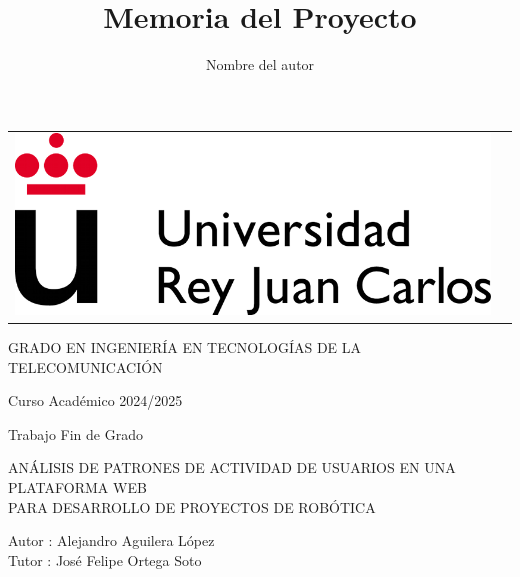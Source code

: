 \documentclass[a4paper, 12pt]{book}
\title{Memoria del Proyecto}
\author{Nombre del autor}
\begin{document}
 


\begin{titlepage}
\begin{center}
\begin{tabular}[c]{c c}
\includegraphics[scale=1.5]{img/LogoURJC.png}
\\
\end{tabular}

\vspace{3cm}

\Large 
GRADO EN INGENIERÍA EN TECNOLOGÍAS DE LA TELECOMUNICACIÓN

\vspace{0.4cm}

\large
Curso Académico 2024/2025

\vspace{0.8cm}

Trabajo Fin de Grado

\vspace{2cm}

\LARGE ANÁLISIS DE PATRONES DE ACTIVIDAD DE USUARIOS EN UNA PLATAFORMA WEB \\
PARA DESARROLLO DE PROYECTOS DE ROBÓTICA
\vspace{3cm}

\large
Autor : Alejandro Aguilera López \\
Tutor : José Felipe Ortega Soto
\end{center}
\end{titlepage}
\end{document}
